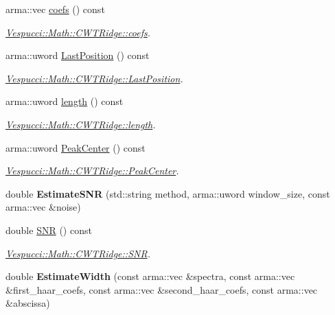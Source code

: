 \begin{DoxyCompactItemize}
\item 
arma\+::vec \hyperlink{class_vespucci_1_1_math_1_1_c_w_t_ridge_a02b63dc6a5194e2ca1c700f5d2ccee21}{coefs} () const 
\begin{DoxyCompactList}\small\item\em \hyperlink{class_vespucci_1_1_math_1_1_c_w_t_ridge_a02b63dc6a5194e2ca1c700f5d2ccee21}{Vespucci\+::\+Math\+::\+C\+W\+T\+Ridge\+::coefs}. \end{DoxyCompactList}\item 
arma\+::uword \hyperlink{class_vespucci_1_1_math_1_1_c_w_t_ridge_aa9202cd791cf53d938d6fb0af13e4446}{Last\+Position} () const 
\begin{DoxyCompactList}\small\item\em \hyperlink{class_vespucci_1_1_math_1_1_c_w_t_ridge_aa9202cd791cf53d938d6fb0af13e4446}{Vespucci\+::\+Math\+::\+C\+W\+T\+Ridge\+::\+Last\+Position}. \end{DoxyCompactList}\item 
arma\+::uword \hyperlink{class_vespucci_1_1_math_1_1_c_w_t_ridge_a04d271916add495f0440baeb4ae88f06}{length} () const 
\begin{DoxyCompactList}\small\item\em \hyperlink{class_vespucci_1_1_math_1_1_c_w_t_ridge_a04d271916add495f0440baeb4ae88f06}{Vespucci\+::\+Math\+::\+C\+W\+T\+Ridge\+::length}. \end{DoxyCompactList}\item 
arma\+::uword \hyperlink{class_vespucci_1_1_math_1_1_c_w_t_ridge_abb141b977007f77c0c13dcbfad4d8705}{Peak\+Center} () const 
\begin{DoxyCompactList}\small\item\em \hyperlink{class_vespucci_1_1_math_1_1_c_w_t_ridge_abb141b977007f77c0c13dcbfad4d8705}{Vespucci\+::\+Math\+::\+C\+W\+T\+Ridge\+::\+Peak\+Center}. \end{DoxyCompactList}\item 
\hypertarget{class_vespucci_1_1_math_1_1_c_w_t_ridge_a2e0cc834ec79cfac37836993cf338ee3}{double {\bfseries Estimate\+S\+N\+R} (std\+::string method, arma\+::uword window\+\_\+size, const arma\+::vec \&noise)}\label{class_vespucci_1_1_math_1_1_c_w_t_ridge_a2e0cc834ec79cfac37836993cf338ee3}

\item 
double \hyperlink{class_vespucci_1_1_math_1_1_c_w_t_ridge_a2b43048af5d133068026c3938153a2b2}{S\+N\+R} () const 
\begin{DoxyCompactList}\small\item\em \hyperlink{class_vespucci_1_1_math_1_1_c_w_t_ridge_a2b43048af5d133068026c3938153a2b2}{Vespucci\+::\+Math\+::\+C\+W\+T\+Ridge\+::\+S\+N\+R}. \end{DoxyCompactList}\item 
\hypertarget{class_vespucci_1_1_math_1_1_c_w_t_ridge_a9e052f0fe46864eb11a79376029fb21a}{double {\bfseries Estimate\+Width} (const arma\+::vec \&spectra, const arma\+::vec \&first\+\_\+haar\+\_\+coefs, const arma\+::vec \&second\+\_\+haar\+\_\+coefs, const arma\+::vec \&abscissa)}\label{class_vespucci_1_1_math_1_1_c_w_t_ridge_a9e052f0fe46864eb11a79376029fb21a}


\end{DoxyCompactItemize}
